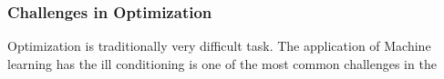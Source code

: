 \subsubsection{Challenges in Optimization}

Optimization is traditionally very difficult task. The application of Machine learning has 
the ill conditioning is one of the most common challenges in the 